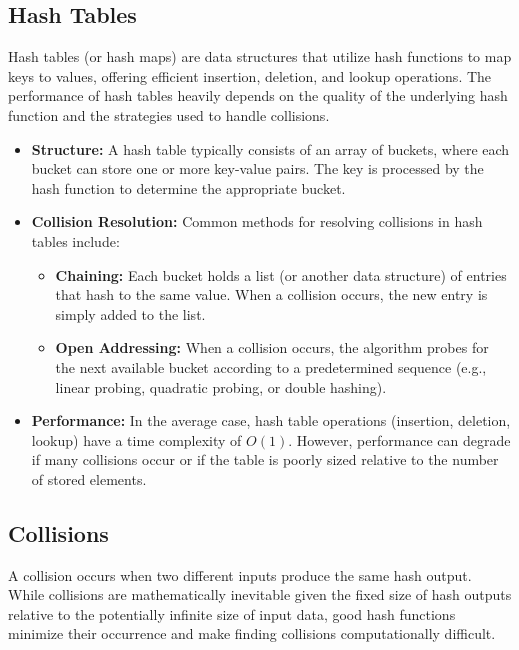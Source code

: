 \subsection{Hash Tables}

Hash tables (or hash maps) are data structures that utilize hash functions to map keys to values, offering efficient insertion, deletion, and lookup operations. The performance of hash tables heavily depends on the quality of the underlying hash function and the strategies used to handle collisions.

\begin{itemize}
    \item \textbf{Structure:} A hash table typically consists of an array of buckets, where each bucket can store one or more key-value pairs. The key is processed by the hash function to determine the appropriate bucket.
    \item \textbf{Collision Resolution:} Common methods for resolving collisions in hash tables include:
    \begin{itemize}
        \item \textbf{Chaining:} Each bucket holds a list (or another data structure) of entries that hash to the same value. When a collision occurs, the new entry is simply added to the list.
        \item \textbf{Open Addressing:} When a collision occurs, the algorithm probes for the next available bucket according to a predetermined sequence (e.g., linear probing, quadratic probing, or double hashing).
    \end{itemize}
    \item \textbf{Performance:} In the average case, hash table operations (insertion, deletion, lookup) have a time complexity of \(O(1)\). However, performance can degrade if many collisions occur or if the table is poorly sized relative to the number of stored elements.
\end{itemize}


\subsection{Collisions}

A collision occurs when two different inputs produce the same hash output. While collisions are mathematically inevitable given the fixed size of hash outputs relative to the potentially infinite size of input data, good hash functions minimize their occurrence and make finding collisions computationally difficult. 

